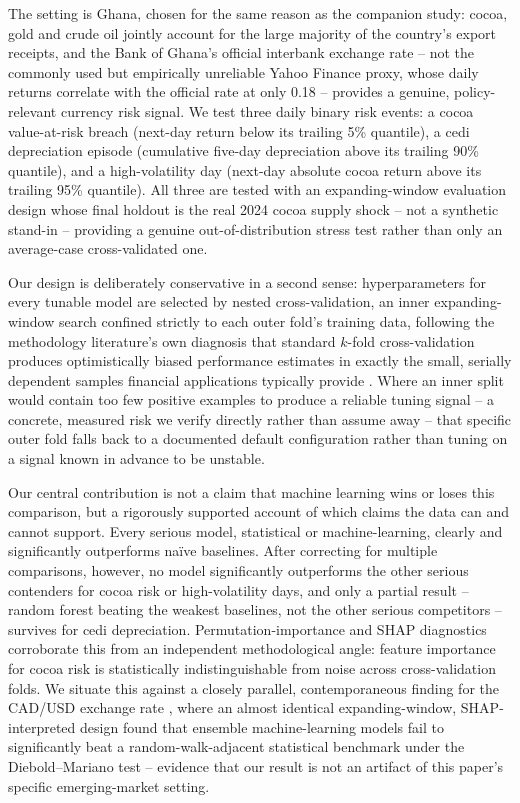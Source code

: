 \documentclass[final,3p,times,authoryear]{elsarticle}
\begin{document}
The setting is Ghana, chosen for the same reason as the companion study:
cocoa, gold and crude oil jointly account for the large majority of the
country's export receipts, and the Bank of Ghana's official interbank
exchange rate -- not the commonly used but empirically unreliable Yahoo
Finance proxy, whose daily returns correlate with the official rate at
only 0.18 -- provides a genuine, policy-relevant currency risk signal.
We test three daily binary risk events: a cocoa value-at-risk breach
(next-day return below its trailing 5\% quantile), a cedi depreciation
episode (cumulative five-day depreciation above its trailing 90\%
quantile), and a high-volatility day (next-day absolute cocoa return
above its trailing 95\% quantile). All three are tested with an
expanding-window evaluation design whose final holdout is the real 2024
cocoa supply shock -- not a synthetic stand-in -- providing a genuine
out-of-distribution stress test rather than only an average-case
cross-validated one.

Our design is deliberately conservative in a second sense: hyperparameters
for every tunable model are selected by nested cross-validation, an
inner expanding-window search confined strictly to each outer fold's
training data, following the methodology literature's own diagnosis
that standard $k$-fold cross-validation produces optimistically biased
performance estimates in exactly the small, serially dependent samples
financial applications typically provide \citep{vabalas2019}. Where an
inner split would contain too few positive examples to produce a
reliable tuning signal -- a concrete, measured risk we verify directly
rather than assume away -- that specific outer fold falls back to a
documented default configuration rather than tuning on a signal known in
advance to be unstable.

Our central contribution is not a claim that machine learning wins or
loses this comparison, but a rigorously supported account of which
claims the data can and cannot support. Every serious model, statistical
or machine-learning, clearly and significantly outperforms na\"ive
baselines. After correcting for multiple comparisons, however, no model
significantly outperforms the other serious contenders for cocoa risk or
high-volatility days, and only a partial result -- random forest beating
the weakest baselines, not the other serious competitors -- survives for
cedi depreciation. Permutation-importance and SHAP diagnostics
corroborate this from an independent methodological angle: feature
importance for cocoa risk is statistically indistinguishable from noise
across cross-validation folds. We situate this against a closely
parallel, contemporaneous finding for the CAD/USD exchange rate
\citep{caudsdstudy2026}, where an almost identical expanding-window,
SHAP-interpreted design found that ensemble machine-learning models fail
to significantly beat a random-walk-adjacent statistical benchmark under
the Diebold--Mariano test -- evidence that our result is not an artifact
of this paper's specific emerging-market setting.
\end{document}
